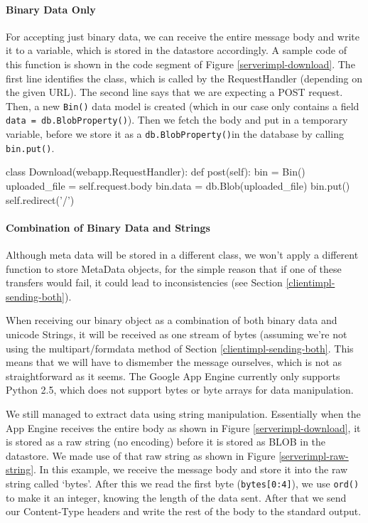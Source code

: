 \paragraph{Binary Data Only}
For accepting just binary data, we can receive the entire message body and write
it to a variable, which is stored in the datastore accordingly. A sample code of
this function is shown in the code segment of Figure \ref{serverimpl-download}.
The first line identifies the class, which is called by the RequestHandler
(depending on the given URL). The second line says that we are expecting a POST
request. Then, a new \texttt{Bin()} data model is created (which in our case only
contains a field \texttt{data = db.BlobProperty()}). Then we fetch the body and
put in a temporary variable, before we store it as a \texttt{db.BlobProperty()}in
the database by calling \texttt{bin.put()}.

\begin{figure*}[ht] %
\begin{center}
\begin{code}
class Download(webapp.RequestHandler):
  def post(self):
    bin = Bin()
    uploaded_file = self.request.body
    bin.data = db.Blob(uploaded_file)
    bin.put()
    self.redirect('/')
\end{code}
\caption{Accepting Binary Data.\label{serverimpl-download}}
\end{center}
\end{figure*}
      
\paragraph{Combination of Binary Data and Strings}
Although meta data will be stored in a different class, we won't apply a
different function to store MetaData objects, for the simple reason that if one
of these transfers would fail, it could lead to inconsistencies (see Section
\ref{clientimpl-sending-both}).

When receiving our binary object as a combination of both binary data and
unicode Strings, it will be received as one stream of bytes (assuming we're not
using the multipart/formdata method of Section \ref{clientimpl-sending-both}.
This means that we will have to dismember the message ourselves, which is
not as straightforward as it seems. The Google App Engine currently only
supports Python 2.5, which does not support bytes or byte arrays for data
manipulation.

We still managed to extract data using string manipulation. Essentially when the
App Engine receives the entire body as shown in Figure \ref{serverimpl-download},
it is stored as a raw string (no encoding) before it is stored as BLOB in the
datastore. We made use of that raw string as shown in Figure
\ref{serverimpl-raw-string}. In this example, we receive the message body and
store it into the raw string called `bytes'. After this we read the first byte
(\texttt{bytes[0:4]}), we use \texttt{ord()} to make it an integer, knowing the
length of the data sent. After that we send our Content-Type headers and write
the rest of the body to the standard output.

